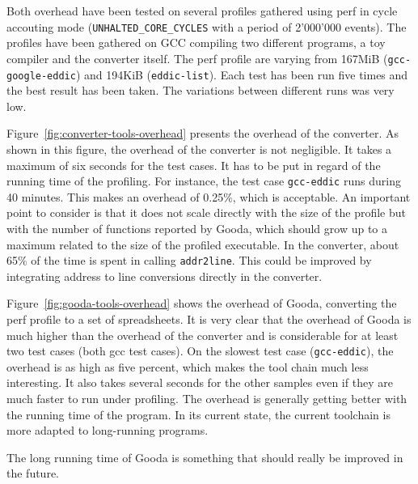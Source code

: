 \documentclass[9pt,english,twocolumn,letter]{article}
\begin{document}
Both overhead have been tested on several profiles gathered using perf in cycle accouting mode (\texttt{UNHALTED\_CORE\_CYCLES} with a period of 2'000'000 events). The profiles have been gathered on GCC compiling two different programs, a toy compiler and the converter itself. The perf profile are varying from 167MiB (\texttt{gcc-google-eddic}) and 194KiB (\texttt{eddic-list}). Each test has been run five times and the best result has been taken. The variations between different runs was very low.

Figure~\ref{fig:converter-tools-overhead} presents the overhead of the converter. As shown in this figure, the overhead of the converter is not negligible. It takes a maximum of six seconds for the test cases. It has to be put in regard of the running time of the profiling. For instance, the test case \texttt{gcc-eddic} runs during 40 minutes. This makes an overhead of 0.25\%, which is acceptable. An important point to consider is that it does not scale directly with the size of the profile but with the number of functions reported by Gooda, which should grow up to a maximum related to the size of the profiled executable. In the converter, about 65\% of the time is spent in calling \texttt{addr2line}. This could be improved by integrating address to line conversions directly in the converter.

Figure~\ref{fig:gooda-tools-overhead} shows the overhead of Gooda, converting the perf profile to a set of spreadsheets. It is very clear that the overhead of Gooda is much higher than the overhead of the converter and is considerable for at least two test cases (both gcc test cases). On the slowest test case (\texttt{gcc-eddic}), the overhead is as high as five percent, which makes the tool chain much less interesting. It also takes several seconds for the other samples even if they are much faster to run under profiling. The overhead is generally getting better with the running time of the program. In its current state, the current toolchain is more adapted to long-running programs.

The long running time of Gooda is something that should really be improved in the future.
\end{document}
